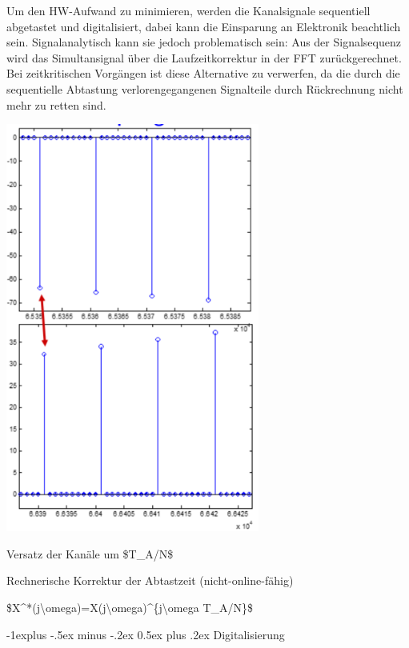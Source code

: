 \documentclass[a4paper]{article}
\makeatletter
\renewcommand{\subsection}{\@startsection{subsection}{2}{0mm}%
 {-1explus -.5ex minus -.2ex}%
 {0.5ex plus .2ex}%
 {\normalfont\normalsize\bfseries}}
\makeatother
\begin{document}
\begin{multicols}{3}
\begin{itemize*}
    \begin{itemize*}
      \item Um den HW-Aufwand zu minimieren, werden die Kanalsignale sequentiell abgetastet und digitalisiert, dabei kann die Einsparung an Elektronik beachtlich sein. Signalanalytisch kann sie jedoch problematisch sein: Aus der Signalsequenz wird das Simultansignal über die Laufzeitkorrektur in der FFT zurückgerechnet. Bei zeitkritischen Vorgängen ist diese Alternative zu verwerfen, da die durch die sequentielle Abtastung verlorengegangenen Signalteile durch Rückrechnung nicht mehr zu retten sind.
    \end{itemize*}
    \item \includegraphics[width=.5\linewidth]{Assets/Biosignalverarbeitung-Mehrkanalsysteme4.png}
    \begin{itemize*}
      \item Versatz der Kanäle um \$T\_A/N\$
      \item Rechnerische Korrektur der Abtastzeit (nicht-online-fähig)
      \item \$X\^{}*(j\textbackslash omega)=X(j\textbackslash omega)\^{}\{j\textbackslash omega T\_A/N\}\$
    \end{itemize*}
  \end{itemize*}


  \subsection{Digitalisierung}\label{digitalisierung}


\end{multicols}
\end{document}
